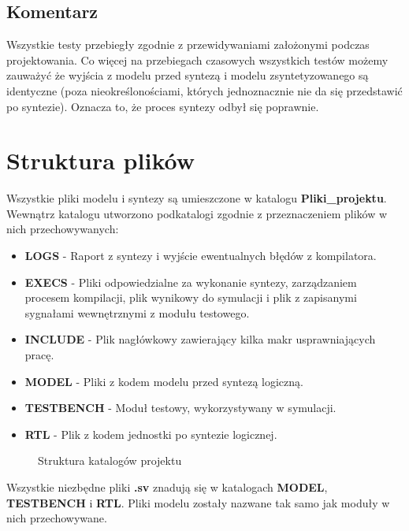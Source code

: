 \documentclass[12pt]{article}
\begin{document}
	\subsection*{Komentarz}
	Wszystkie testy przebiegły zgodnie z przewidywaniami założonymi podczas projektowania. Co więcej na przebiegach czasowych wszystkich testów możemy zauważyć że wyjścia z modelu przed syntezą i modelu zsyntetyzowanego są identyczne (poza nieokreślonościami, których jednoznacznie nie da się przedstawić po syntezie). Oznacza to, że proces syntezy odbył się poprawnie. 
	
\section*{Struktura plików}
	Wszystkie pliki modelu i syntezy są umieszczone w katalogu \textbf{Pliki\_projektu}. Wewnątrz katalogu utworzono podkatalogi zgodnie z przeznaczeniem plików w nich przechowywanych:
	\newpage
	
\begin{itemize}
\item \textbf{LOGS} - Raport z syntezy i wyjście ewentualnych błędów z kompilatora. 
\item \textbf{EXECS} - Pliki odpowiedzialne za wykonanie syntezy, zarządzaniem procesem kompilacji, plik wynikowy do symulacji i plik z zapisanymi sygnałami wewnętrznymi z modułu testowego.
\item \textbf{INCLUDE} - Plik nagłówkowy zawierający kilka makr usprawniających pracę.
\item \textbf{MODEL} - Pliki z kodem modelu przed syntezą logiczną.
\item \textbf{TESTBENCH} -  Moduł testowy, wykorzystywany w symulacji.
\item \textbf{RTL} - Plik z kodem jednostki po syntezie logicznej.	
\end{itemize}

\begin{figure}
\caption*{Struktura katalogów projektu}
\label{figure:catalogues}
\end{figure}

Wszystkie niezbędne pliki \textbf{.sv} znadują się w katalogach \textbf{MODEL}, \textbf{TESTBENCH} i \textbf{RTL}. Pliki modelu zostały nazwane tak samo jak moduły w nich przechowywane.
	 
\end{document}
